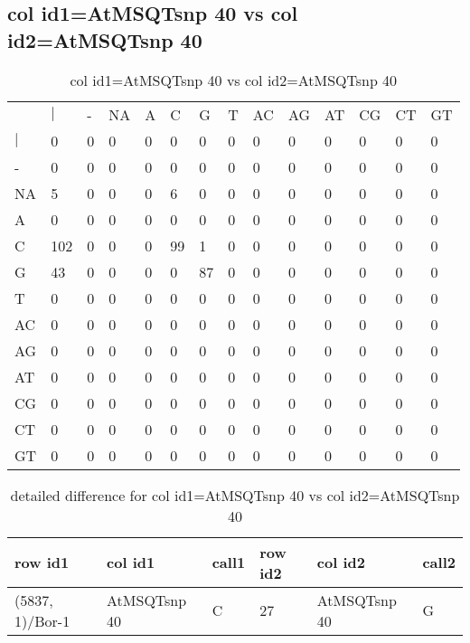 \subsection{col id1=AtMSQTsnp 40 vs col id2=AtMSQTsnp 40}
\begin{center}
\begin{longtable}{|l|l|l|l|l|l|l|l|l|l|l|l|l|l|}
\caption{col id1=AtMSQTsnp 40 vs col id2=AtMSQTsnp 40} \label{table_dm918}\\
\hline
\\
\hline
&$|$&-&NA&A&C&G&T&AC&AG&AT&CG&CT&GT\\
$|$&0&0&0&0&0&0&0&0&0&0&0&0&0\\
-&0&0&0&0&0&0&0&0&0&0&0&0&0\\
NA&5&0&0&0&6&0&0&0&0&0&0&0&0\\
A&0&0&0&0&0&0&0&0&0&0&0&0&0\\
C&102&0&0&0&99&1&0&0&0&0&0&0&0\\
G&43&0&0&0&0&87&0&0&0&0&0&0&0\\
T&0&0&0&0&0&0&0&0&0&0&0&0&0\\
AC&0&0&0&0&0&0&0&0&0&0&0&0&0\\
AG&0&0&0&0&0&0&0&0&0&0&0&0&0\\
AT&0&0&0&0&0&0&0&0&0&0&0&0&0\\
CG&0&0&0&0&0&0&0&0&0&0&0&0&0\\
CT&0&0&0&0&0&0&0&0&0&0&0&0&0\\
GT&0&0&0&0&0&0&0&0&0&0&0&0&0\\
\hline
\end{longtable}
\end{center}

\begin{center}
\begin{longtable}{|l|l|l|l|l|l|}
\caption{detailed difference for col id1=AtMSQTsnp 40 vs col id2=AtMSQTsnp 40} \label{table_dm919}\\
\hline
row id1&col id1&call1&row id2&col id2&call2\\
\hline
(5837, 1)/Bor-1&AtMSQTsnp 40&C&27&AtMSQTsnp 40&G\\
\hline
\end{longtable}
\end{center}

